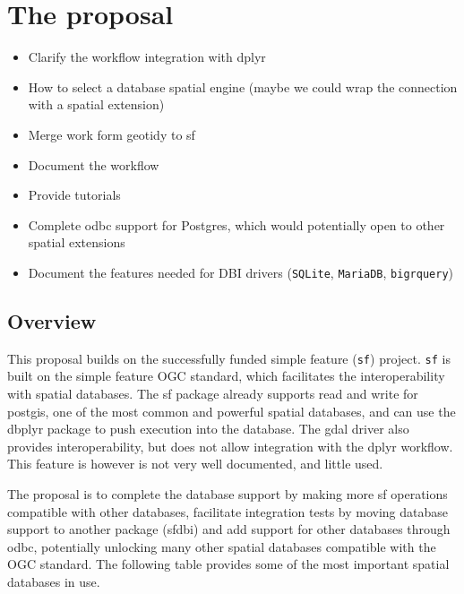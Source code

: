 \documentclass[]{article}
\providecommand{\tightlist}{%
  \setlength{\itemsep}{0pt}\setlength{\parskip}{0pt}}
\begin{document}
\hypertarget{the-proposal}{%
\section{The proposal}\label{the-proposal}}

\begin{itemize}
\tightlist
\item
  Clarify the workflow integration with dplyr
\item
  How to select a database spatial engine (maybe we could wrap the
  connection with a spatial extension)
\item
  Merge work form geotidy to sf
\item
  Document the workflow
\item
  Provide tutorials
\item
  Complete odbc support for Postgres, which would potentially open to
  other spatial extensions
\item
  Document the features needed for DBI drivers (\texttt{SQLite},
  \texttt{MariaDB}, \texttt{bigrquery})
\end{itemize}

\hypertarget{overview}{%
\subsection{Overview}\label{overview}}

This proposal builds on the successfully funded simple feature
(\texttt{sf}) project. \texttt{sf} is built on the simple feature OGC
standard, which facilitates the interoperability with spatial databases.
The sf package already supports read and write for postgis, one of the
most common and powerful spatial databases, and can use the dbplyr
package to push execution into the database. The gdal driver also
provides interoperability, but does not allow integration with the dplyr
workflow. This feature is however is not very well documented, and
little used.

The proposal is to complete the database support by making more sf
operations compatible with other databases, facilitate integration tests
by moving database support to another package (sfdbi) and add support
for other databases through odbc, potentially unlocking many other
spatial databases compatible with the OGC standard. The following table
provides some of the most important spatial databases in use.
\end{document}
